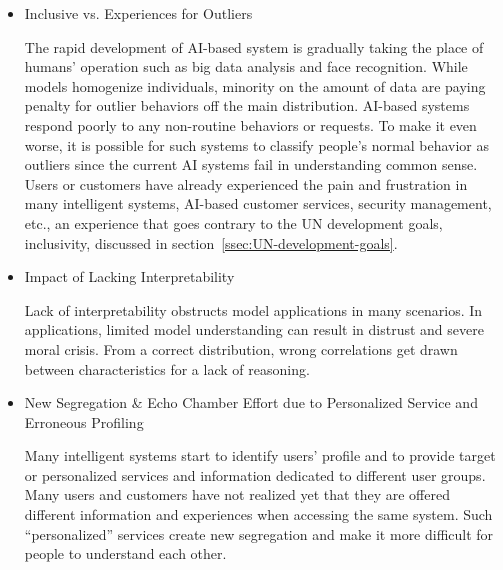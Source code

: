 \documentclass[letterpaper, twocolumn, 10pt, conference]{IEEEtran}
\begin{document}
\begin{itemize}
\item Inclusive vs. Experiences for Outliers
	
The rapid development of AI-based system is gradually taking the place of humans’ operation such as big data analysis and face recognition. While models homogenize individuals, minority on the amount of data are paying penalty for outlier behaviors off the main distribution. AI-based systems respond poorly to any non-routine behaviors or requests. To make it even worse, it is possible for such systems to classify people’s normal behavior as outliers since the current AI systems fail in understanding common sense. Users or customers have already experienced the pain and frustration in many intelligent systems, AI-based customer services, security management, etc., an experience that goes contrary to  the UN development goals, inclusivity, discussed in section~\ref{ssec:UN-development-goals}. 



\item Impact of Lacking Interpretability

Lack of interpretability obstructs model applications in many scenarios. 
In applications, limited model understanding can result in distrust and severe moral crisis. From a correct distribution, wrong correlations get drawn between characteristics for a lack of reasoning. 
                                                
\item New Segregation \& Echo Chamber Effort due to Personalized Service and Erroneous Profiling
                        
Many intelligent systems start to identify users’ profile and to provide target or personalized services and information dedicated to different user groups. Many users and customers have not realized yet that they are offered different information and experiences when accessing the same system. 
Such \enquote{personalized} services create new segregation and make it more difficult for people to understand each other. 
                        

\end{itemize}
\end{document}
